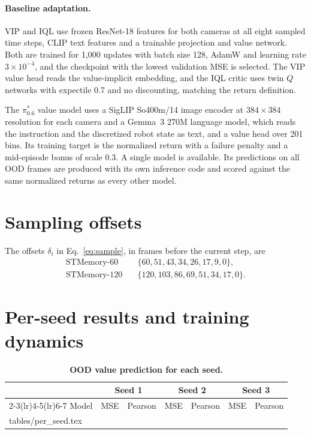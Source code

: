 \documentclass[10pt,a4paper]{article}
\makeatletter
\newcommand{\tabinput}[1]{\@@input #1 }
\makeatother
\begin{document}
\paragraph{Baseline adaptation.}
VIP and IQL use frozen ResNet-18 features for both cameras at all eight sampled time steps, CLIP text features and a trainable projection and value network. Both are trained for 1,000 updates with batch size 128, AdamW and learning rate $3\times10^{-4}$, and the checkpoint with the lowest validation MSE is selected. The VIP value head reads the value-implicit embedding, and the IQL critic uses twin $Q$ networks with expectile 0.7 and no discounting, matching the return definition.

The $\pi^{*}_{0.6}$ value model uses a SigLIP So400m/14 image encoder at $384\times384$ resolution for each camera and a Gemma~3 270M language model, which reads the instruction and the discretized robot state as text, and a value head over 201 bins. Its training target is the normalized return with a failure penalty and a mid-episode bonus of scale 0.3. A single model is available. Its predictions on all OOD frames are produced with its own inference code and scored against the same normalized returns as every other model.

\section{Sampling offsets}
\label{app:offsets}

The offsets $\delta_i$ in Eq.~\eqref{eq:sample}, in frames before the current step, are
\begin{align*}
\text{STMemory-60}\quad &\{60,51,43,34,26,17,9,0\},\\
\text{STMemory-120}\quad &\{120,103,86,69,51,34,17,0\}.
\end{align*}

\section{Per-seed results and training dynamics}

\begin{table}[H]
\centering
\caption{\textbf{OOD value prediction for each seed.}}
\label{tab:perseed}
\small
\begin{tabular}{lcccccc}
\toprule
& \multicolumn{2}{c}{Seed 1} & \multicolumn{2}{c}{Seed 2} & \multicolumn{2}{c}{Seed 3} \\
\cmidrule(lr){2-3}\cmidrule(lr){4-5}\cmidrule(lr){6-7}
Model & MSE & Pearson & MSE & Pearson & MSE & Pearson \\
\midrule
\tabinput{tables/per_seed.tex}
\bottomrule
\end{tabular}
\end{table}
\end{document}
